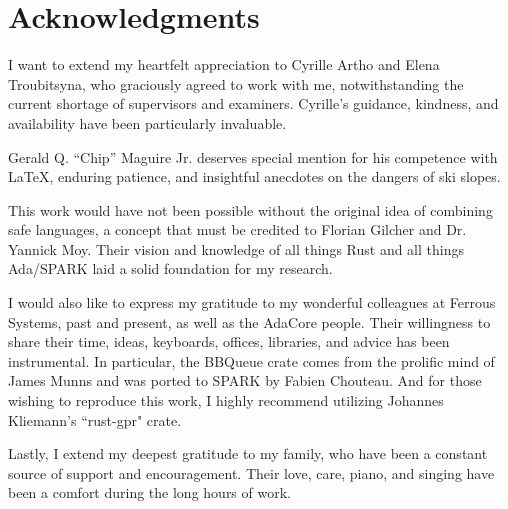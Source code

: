 \documentclass[nomenclature, english, bibtex]{kththesis}
\newcommand*{\engExpl}[1]{\todo[inline, backgroundcolor=kth-lightgreen40]{#1}} %
\begin{document}
\cleardoublepage

\section*{Acknowledgments}

I want to extend my heartfelt appreciation to Cyrille Artho and Elena Troubitsyna, who graciously agreed to work with me, notwithstanding the current shortage of supervisors and examiners. Cyrille's guidance, kindness, and availability have been particularly invaluable.

Gerald Q. ``Chip'' Maguire Jr. deserves special mention for his competence with \LaTeX, enduring patience, and insightful anecdotes on the dangers of ski slopes.

This work would have not been possible without the original idea of combining safe languages, a concept that must be credited to Florian Gilcher and Dr. Yannick Moy. Their vision and knowledge of all things Rust and all things Ada/SPARK laid a solid foundation for my research.

I would also like to express my gratitude to my wonderful colleagues at Ferrous Systems, past and present, as well as the AdaCore people. Their willingness to share their time, ideas, keyboards, offices, libraries, and advice has been instrumental. In particular, the BBQueue crate comes from the prolific mind of James Munns and was ported to SPARK by Fabien Chouteau. And for those wishing to reproduce this work, I highly recommend utilizing Johannes Kliemann's ``rust-gpr" crate. 

Lastly, I extend my deepest gratitude to my family, who have been a constant source of support and encouragement. Their love, care, piano, and singing have been a comfort during the long hours of work.

\acknowlegmentssignature

\renewcommand{\chaptermark}[1]{ \markboth{#1}{}} 
\tableofcontents
  \markboth{\contentsname}{}

\cleardoublepage
\listoffigures

\cleardoublepage

\listoftables
\cleardoublepage
 \listoflistings
 
\cleardoublepage


\printglossary[style=mylong, type=\acronymtype, title={List of acronyms and abbreviations}]
\end{document}
